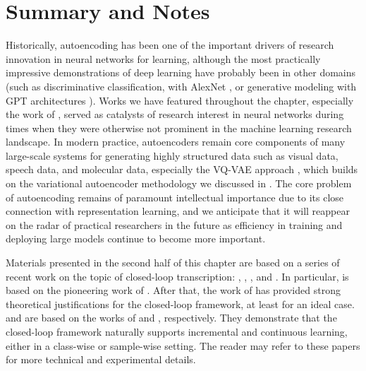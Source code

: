 \documentclass[../../book-main.tex]{subfiles}
\begin{document}
\section{Summary and Notes}
Historically, autoencoding has been one of the important drivers of research
innovation in neural networks for learning, although the most practically
impressive demonstrations of deep learning have probably been in other domains
(such as discriminative classification, with AlexNet
\cite{krizhevsky2012imagenet}, or generative modeling with GPT architectures
\cite{brown2020language}).
Works we have featured throughout the chapter, especially the work of
\cite{Hinton504}, served as catalysts of research interest in neural networks
during times when they were otherwise not prominent in the machine learning
research landscape. 
In modern practice, autoencoders remain core components of many large-scale
systems for generating highly structured data such as visual data, speech data,
and molecular data, especially the VQ-VAE approach
\cite{van-den-Oord2017-jr}, which builds on the variational autoencoder
methodology we discussed in .
The core problem of autoencoding remains of paramount intellectual importance
due to its close connection with representation learning, and we anticipate that
it will reappear on the radar of practical researchers in the future as
efficiency in training and deploying large models continue to become more
important.

Materials presented in the second half of this chapter are based on a series of
recent work on the topic of closed-loop transcription: \cite{Dai-entropy-2022}, 
\cite{pai2022pursuit}, \cite{tong2023incremental}, and \cite{pmlr-v234-tong24a}. In particular,  is based on the pioneering work of \cite{Dai-entropy-2022}. After that, the work of \cite{pai2022pursuit} has provided strong theoretical justifications for the closed-loop framework, at least for an ideal case.  and  are based on the works of \cite{tong2023incremental} and \cite{pmlr-v234-tong24a}, respectively. They demonstrate that the closed-loop framework naturally supports incremental and continuous learning, either in a class-wise or sample-wise setting. The reader may refer to these papers for more technical and experimental details.
\end{document}

